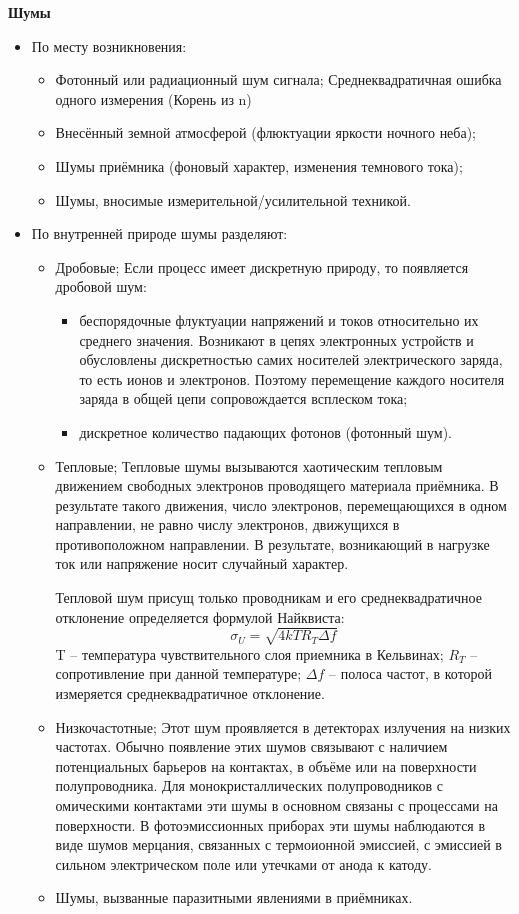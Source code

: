 \documentclass[12pt]{article}
\begin{document}
\textbf{Шумы}
\begin{itemize}
	\item По месту возникновения:
		\begin{itemize}
		\item Фотонный или радиационный шум сигнала;
			Среднеквадратичная ошибка одного измерения (Корень из n)
		\item Внесённый земной атмосферой (флюктуации яркости ночного
		неба);
		\item Шумы приёмника (фоновый характер, изменения темнового
		тока);
		\item Шумы, вносимые измерительной/усилительной техникой.
		\end{itemize}
	\item По внутренней природе шумы разделяют:
	\begin{itemize}
		\item Дробовые; 
			Если процесс имеет дискретную природу, то появляется дробовой шум:
			\begin{itemize}
			\item беспорядочные флуктуации напряжений и токов относительно их среднего значения.
			Возникают в цепях электронных устройств и обусловлены дискретностью самих
			носителей электрического заряда, то есть ионов и электронов. Поэтому перемещение
			каждого носителя заряда в общей цепи сопровождается всплеском тока;
			\item дискретное количество падающих фотонов (фотонный шум).
			\end{itemize}
		\item Тепловые;
		Тепловые шумы вызываются хаотическим тепловым движением свободных электронов
		проводящего материала приёмника. В результате такого движения, число электронов,
		перемещающихся в одном направлении, не равно числу электронов, движущихся в
		противоположном направлении. В результате, возникающий в нагрузке ток или напряжение
		носит случайный характер. 
		
		Тепловой шум присущ только проводникам и его среднеквадратичное отклонение
		определяется формулой Найквиста:
		 $$\sigma_U=\sqrt{4kTR_T\Delta f}$$
		 T -- температура чувствительного слоя приемника в Кельвинах; $R_T$ -- сопротивление при данной температуре; $\Delta f$ -- полоса частот, в которой измеряется среднеквадратичное отклонение.
		\item Низкочастотные; Этот шум проявляется в детекторах излучения на низких частотах. Обычно появление этих
		шумов связывают с наличием потенциальных барьеров на контактах, в объёме или на
		поверхности полупроводника. Для монокристаллических полупроводников с омическими
		контактами эти шумы в основном связаны с процессами на поверхности. 
		В фотоэмиссионных приборах эти шумы наблюдаются в виде шумов мерцания, связанных с
		термоионной эмиссией, с эмиссией в сильном электрическом поле или утечками от анода к
		катоду.
		\item Шумы, вызванные паразитными явлениями в приёмниках.
	\end{itemize}
\end{itemize}
\end{document}

